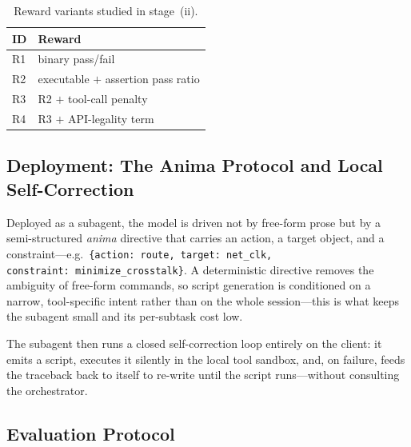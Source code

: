 \begin{table}[t]
\centering
\caption{Reward variants studied in stage~(ii).}
\label{tab:reward}
\begin{tabular}{ll}
\toprule
\textbf{ID} & \textbf{Reward} \\
\midrule
R1 & binary pass/fail \\
R2 & executable $+$ assertion pass ratio \\
R3 & R2 $+$ tool-call penalty \\
R4 & R3 $+$ API-legality term \\
\bottomrule
\end{tabular}
\end{table}

\subsection{Deployment: The Anima Protocol and Local Self-Correction}\label{sec:anima}

Deployed as a subagent, the model is driven not by free-form prose but by a semi-structured \emph{anima} directive that carries an action, a target object, and a constraint---e.g.\ \texttt{\{action:\ route, target:\ net\_clk, constraint:\ minimize\_crosstalk\}}.
A deterministic directive removes the ambiguity of free-form commands, so script generation is conditioned on a narrow, tool-specific intent rather than on the whole session---this is what keeps the subagent small and its per-subtask cost low.

The subagent then runs a closed self-correction loop entirely on the client: it emits a script, executes it silently in the local tool sandbox, and, on failure, feeds the traceback back to itself to re-write until the script runs---without consulting the orchestrator.

\subsection{Evaluation Protocol}\label{sec:posttrain-eval}

